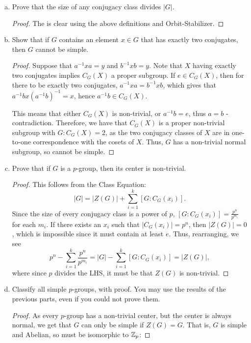 \begin{itemize}
\begin{enumerate}[(a)]
    \item Prove that the size of any conjugacy class divides $|G|$.
    \begin{proof}
        The is clear using the above definitions and Orbit-Stabilizer.
    \end{proof}
    
    \item Show that if $G$ contains an element $x \in G$ that has exactly two conjugates, then $G$ cannot be simple.
    \begin{proof}
        Suppose that $a^{-1}xa = y$ and $b^{-1}xb = y$. 
        Note that $X$ having exactly two conjugates implies $C_G(X)$ a proper subgroup. If $e \in C_G(X)$, then for there to be exactly two conjugates, $a^{-1}xa = b^{-1}xb$, which gives that $a^{-1}b x (a^{-1}b)^{-1} = x$, hence $a^{-1}b \in C_G(X)$. 
        \medskip 
        
        This means that either $C_G(X)$ is non-trivial, or $a^{-1}b=e$, thus $a=b$ - contradiction. Therefore, we have that $C_G(X)$ is a proper non-trivial subgroup with $G : C_G(X) = 2$, as the two conjugacy classes of $X$ are in one-to-one correspondence with the cosets of $X$. Thus, $G$ has a non-trivial normal subgroup, so cannot be simple.
    \end{proof}
    
    \item Prove that if $G$ is a $p$-group, then its center is non-trivial.
    \begin{proof}
    This follows from the Class Equation:
    $$|G| = |Z(G)| + \sum_{i=1}^k [G:C_G(x_i)].$$
    Since the size of every conjugacy class is a power of $p$, $[G:C_G(x_i)] = \frac{p^n}{p^{m_i}}$ for each $m_i$. If there exists an $x_i$ such that $|C_G(x_i)| = p^n$, then $|Z(G)|=0$, which is impossible since it must contain at least $e$. 
    Thus, rearranging, we see 
    $$p^n - \sum_{i=1}^k \frac{p^n}{p^{m_i}} = |G| - \sum_{i=1}^k [G:C_G(x_i)] = |Z(G)|,$$
    where since $p$ divides the LHS, it must be that $Z(G)$ is non-trivial.
    \end{proof}

    \item Classify all simple $p$-groups, with proof. You may use the results of the previous parts, even if you could not prove them.
    \begin{proof}
    As every $p$-group has a non-trivial center, but the center is always normal, we get that $G$ can only be simple if $Z(G) = G$. That is, $G$ is simple and Abelian, so must be isomorphic to $\mathbb{Z}_p$: 
    \medskip 
    

\end{proof}
\end{enumerate}
\end{itemize}

